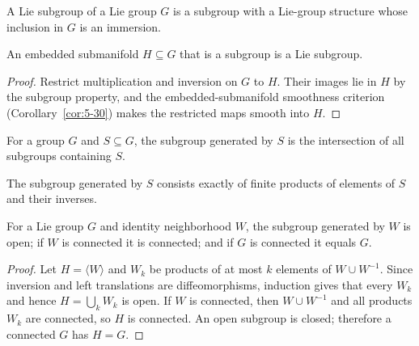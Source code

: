 \begin{definition}
\label{def:7-49-extra-1}
\leanok
A Lie subgroup of a Lie group $G$ is a subgroup with a Lie-group structure whose inclusion in $G$ is an immersion.
\end{definition}

\begin{proposition}
\label{prop:7-11}
\leanok
{}
An embedded submanifold $H\subseteq G$ that is a subgroup is a Lie subgroup.
\end{proposition}

\begin{proof}
\leanok
\sketch Restrict multiplication and inversion on $G$ to $H$. Their images lie in $H$ by the subgroup property, and the embedded-submanifold smoothness criterion (Corollary~\ref{cor:5-30}) makes the restricted maps smooth into $H$.
\end{proof}

\begin{definition}
\label{def:7-49-extra-2}
\leanok
For a group $G$ and $S\subseteq G$, the subgroup generated by $S$ is the intersection of all subgroups containing $S$.
\end{definition}

\begin{lemma}
\label{exer:7-13}
\leanok
{}
The subgroup generated by $S$ consists exactly of finite products of elements
of $S$ and their inverses.
\end{lemma}

\begin{proposition}
\label{prop:7-14}
\leanok
{}
For a Lie group $G$ and identity neighborhood $W$, the subgroup generated by $W$ is open; if $W$ is connected it is connected; and if $G$ is connected it equals $G$.
\end{proposition}

\begin{proof}
\leanok
\sketch Let $H=\langle W\rangle$ and $W_k$ be products of at most $k$ elements of $W\cup W^{-1}$. Since inversion and left translations are diffeomorphisms, induction gives that every $W_k$ and hence $H=\bigcup_kW_k$ is open. If $W$ is connected, then $W\cup W^{-1}$ and all products $W_k$ are connected, so $H$ is connected. An open subgroup is closed; therefore a connected $G$ has $H=G$.
\end{proof}

